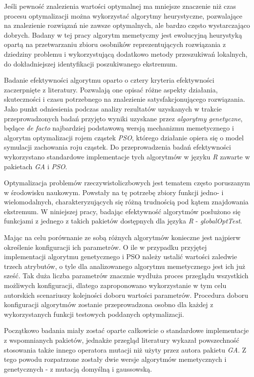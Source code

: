 \par
Jeśli pewność znalezienia wartości optymalnej ma mniejsze znaczenie niż czas procesu optymalizacji można wykorzystać algorytmy heurystyczne, pozwalające na znalezienie rozwiązań nie zawsze optymalnych, ale bardzo często wystarczająco dobrych. Badany w tej pracy algorytm memetyczny jest ewolucyjną heurystyką opartą na przetwarzaniu zbioru osobników reprezentujących rozwiązania z dziedziny problemu i wykorzystującą dodatkowo metody przeszukiwań lokalnych, do dokładniejszej identyfikacji poszukiwanego ekstremum. 
\par
Badanie efektywności algorytmu oparto o cztery kryteria efektywności zaczerpnięte z literatury. Pozwalają one opisać różne aspekty działania, skuteczności i czasu potrzebnego na znalezienie satysfakcjonującego rozwiązania. Jako punkt odniesienia podczas analizy rezultatów uzyskanych w trakcie  przeprowadzonych badań przyjęto wyniki uzyskane przez \emph{algorytmy genetyczne}, będące \emph{de facto} najbardziej podstawową wersją  mechanizmu memetycznego i algorytm optymalizacji rojem cząstek \emph{PSO}, którego działanie opiera się o model symulacji zachowania roju cząstek. Do przeprowadzenia badań efektywności wykorzystano standardowe implementacje tych algorytmów w języku \emph{R} zawarte w pakietach \emph{GA} i \emph{PSO}.
\par
Optymalizacja problemów rzeczywistoliczbowych jest tematem często poruszanym w środowisku naukowym. Powstały na tę potrzebę zbiory funkcji jedno- i wielomodalnych, charakteryzujących się różną trudnością pod kątem znajdowania ekstremum. W niniejszej pracy, badając efektywność algorytmów posłużono się funkcjami z jednego z takich pakietów dostępnych dla języka \emph{R} - \emph{globalOptTest}.
\par
Mając na celu porównanie ze sobą różnych algorytmów konieczne jest najpierw określenie konfiguracji ich parametrów. O ile w przypadku przyjętej implementacji algorytmu genetycznego i PSO należy ustalić wartości zaledwie trzech atrybutów, o tyle dla analizowanego algorytmu memetycznego jest ich już sześć. Tak duża liczba parametrów znacznie wydłuża proces przeglądu wszystkich możliwych konfiguracji, dlatego zaproponowano wykorzystanie w tym celu autorskich scenariuszy kolejności doboru wartości parametrów. Procedura doboru konfiguracji algorytmów zostanie przeprowadzona osobno dla każdej z wykorzystanych funkcji testowych poddanych optymalizacji. 
\par
Początkowo badania miały zostać oparte całkowicie o standardowe implementacje z wspomnianych pakietów, jednakże przegląd literatury wykazał powszechność stosowania także innego operatora mutacji niż użyty przez autora pakietu \emph{GA}. Z tego powodu rozpatrzone zostały dwie wersje algorytmów memetycznych i genetycznych - z mutacją domyślną i gaussowską. 


